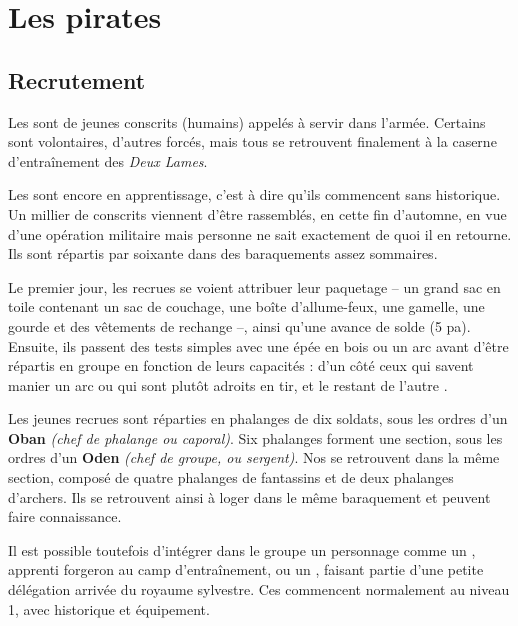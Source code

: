 \documentclass[a4paper,10pt,openany]{book}
\begin{document}
\chapter{Les pirates}

\begin{multicols}{2}

\section{Recrutement}
Les \PJs sont de jeunes conscrits (humains) appelés à servir dans l’armée. Certains sont volontaires, d’autres forcés, mais tous se retrouvent
finalement à la caserne d’entraînement des \emph{Deux Lames}.\par Les \PJs sont encore en apprentissage, c’est à dire qu’ils commencent sans
historique. Un millier de conscrits viennent d’être rassemblés, en cette fin d’automne, en vue d’une opération militaire mais personne ne sait
exactement de quoi il en retourne. Ils sont répartis par soixante dans des baraquements assez sommaires.\par Le premier jour, les recrues se voient
attribuer leur paquetage – un grand sac en toile contenant  un sac de couchage, une boîte d’allume-feux, une gamelle, une gourde et des vêtements de
rechange –, ainsi qu’une avance de solde (5 pa). Ensuite, ils passent des tests simples avec une épée en bois ou un arc avant d’être répartis en
groupe en fonction de leurs capacités : d’un côté ceux qui savent manier un arc ou qui sont plutôt adroits en tir, et le restant de l’autre .\par

Les jeunes recrues sont réparties en phalanges de dix soldats, sous les ordres d’un \textbf{Oban} \emph{(chef de phalange ou caporal)}. Six phalanges
forment une section, sous les ordres d’un \textbf{Oden} \emph{(chef de groupe, ou sergent)}. Nos \PJs se retrouvent dans la même section,
composé de quatre phalanges de fantassins et de deux phalanges d’archers. Ils se retrouvent ainsi à loger dans le même baraquement et peuvent faire
connaissance.

\begin{quotebox}
	Il est possible toutefois d’intégrer dans le groupe un personnage comme un \Nain, apprenti forgeron au camp d’entraînement, ou un \Elfe, faisant
	partie d’une petite délégation arrivée du royaume sylvestre. Ces \PJs commencent normalement au niveau 1, avec historique et équipement.
\end{quotebox}


\end{multicols}
\end{document}
